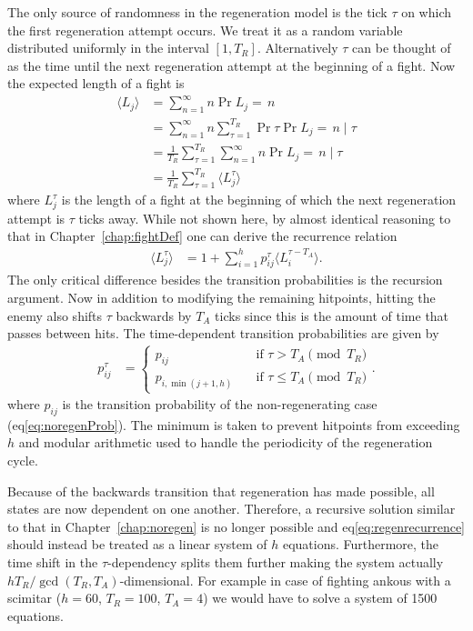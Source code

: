 The only source of randomness in the regeneration model is the tick $\tau$ on which the first regeneration attempt occurs. We treat it as a random variable distributed uniformly in the interval $[1, T_R]$. Alternatively $\tau$ can be thought of as the time until the next regeneration attempt at the beginning of a fight. Now the expected length of a fight is
\begin{align}
	\langle L_j \rangle
		&= \sum_{n=1}^{\infty}n\Pr{L_j=\,n}\nonumber\\
		&= \sum_{n=1}^{\infty}n\sum_{\tau=1}^{T_R}\Pr{\tau}\Pr{L_j=\,n \mid \tau}\nonumber\\
		&= \frac{1}{T_R}\sum_{\tau=1}^{T_R}\sum_{n=1}^{\infty}n\Pr{L_j=\,n \mid \tau}\nonumber\\
		&= \frac{1}{T_R}\sum_{\tau=1}^{T_R} \langle L_j^\tau \rangle
\end{align}
where $L_j^\tau$ is the length of a fight at the beginning of which the next regeneration attempt is $\tau$ ticks away. While not shown here, by almost identical reasoning to that in Chapter~\ref{chap:fightDef} one can derive the recurrence relation
\begin{align}\label{eq:regenrecurrence}
	\langle L_j^\tau \rangle
		&= 1 + \sum_{i=1}^{h} p_{ij}^\tau \langle L_i^{\tau - T_A} \rangle.
\end{align}
The only critical difference besides the transition probabilities is the recursion argument. Now in addition to modifying the remaining hitpoints, hitting the enemy also shifts $\tau$ backwards by $T_A$ ticks since this is the amount of time that passes between hits. The time-dependent transition probabilities are given by
\begin{align}
    p_{ij}^\tau
        &= \begin{cases}
			p_{ij} \quad &\mbox{if } \tau > T_A \pmod {T_R} \\
			p_{i,\min(j+1,h)} \quad &\mbox{if } \tau \leq T_A \pmod {T_R}
		\end{cases}\label{eq:damageDistribution}.
\end{align}
where $p_{ij}$ is the transition probability of the non-regenerating case (eq\ref{eq:noregenProb}). The minimum is taken to prevent hitpoints from exceeding $h$ and modular arithmetic used to handle the periodicity of the regeneration cycle.

Because of the backwards transition that regeneration has made possible, all states are now dependent on one another. Therefore, a recursive solution similar to that in Chapter~\ref{chap:noregen} is no longer possible and eq\ref{eq:regenrecurrence} should instead be treated as a linear system of $h$ equations. Furthermore, the time shift in the $\tau$-dependency splits them further making the system actually $hT_R/\gcd(T_R, T_A)$-dimensional.
For example in case of fighting ankous with a scimitar ($h=60$, $T_R=100$, $T_A=4$) we would have to solve a system of 1500 equations.
